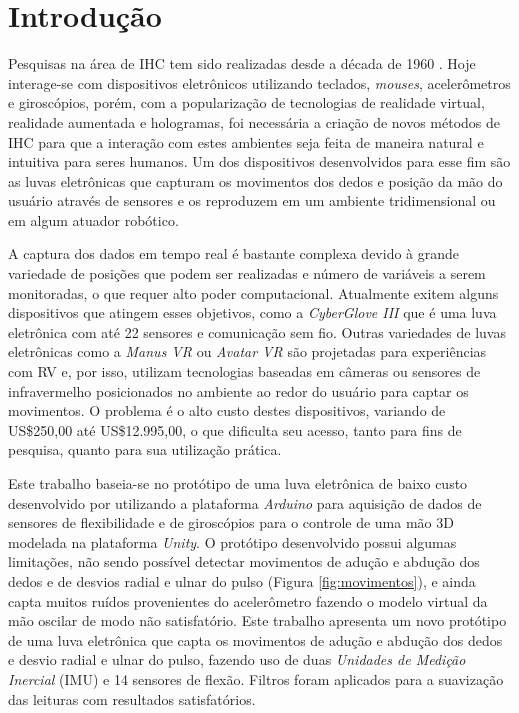 \chapter{Introdução}
\label{ch:intro}
\vspace{-1.9cm}

Pesquisas na área de \acf{IHC} tem sido realizadas desde a década de 1960 \cite{myers1998brief}. Hoje interage-se com dispositivos eletrônicos utilizando teclados, \textit{mouses}, acelerômetros e giroscópios, porém, com a popularização de tecnologias de realidade virtual, realidade aumentada e hologramas, foi necessária a criação de novos métodos de \ac{IHC} para que a interação com estes ambientes seja feita de maneira natural e intuitiva para seres humanos. Um dos dispositivos desenvolvidos para esse fim são as luvas eletrônicas que capturam os movimentos dos dedos e posição da mão do usuário através de sensores e os reproduzem em um ambiente tridimensional ou em algum atuador robótico.

A captura dos dados em tempo real é bastante complexa devido à grande variedade de posições que podem ser realizadas e número de variáveis a serem monitoradas, o que requer alto poder computacional. Atualmente exitem alguns dispositivos que atingem esses objetivos, como a \textit{CyberGlove III} que é uma luva eletrônica com até 22 sensores e comunicação sem fio. Outras variedades de luvas eletrônicas como a \textit{Manus VR} ou \textit{Avatar VR} são projetadas para experiências com \acf{RV} e, por isso, utilizam tecnologias baseadas em câmeras ou sensores de infravermelho posicionados no ambiente ao redor do usuário para captar os movimentos. O problema é o alto custo destes dispositivos, variando de US\$250,00 até US\$12.995,00, o que dificulta seu acesso, tanto para fins de pesquisa, quanto para sua utilização prática.

Este trabalho baseia-se no protótipo de uma luva eletrônica de baixo custo desenvolvido por  utilizando a plataforma \textit{Arduino} para aquisição de dados de sensores de flexibilidade e de giroscópios para o controle de uma mão \acf{3D} modelada na plataforma \textit{Unity}. O protótipo desenvolvido possui algumas limitações, não sendo possível detectar movimentos de adução e abdução dos dedos e de desvios radial e ulnar do pulso (Figura \ref{fig:movimentos}), e ainda capta muitos ruídos provenientes do acelerômetro fazendo o modelo virtual da mão oscilar de modo não satisfatório. Este trabalho apresenta um novo protótipo de uma luva eletrônica que capta os movimentos de adução e abdução dos dedos e desvio radial e ulnar do pulso, fazendo uso de duas \textit{Unidades de Medição Inercial} (IMU) e 14 sensores de flexão. Filtros foram aplicados para a suavização das leituras com resultados satisfatórios.

